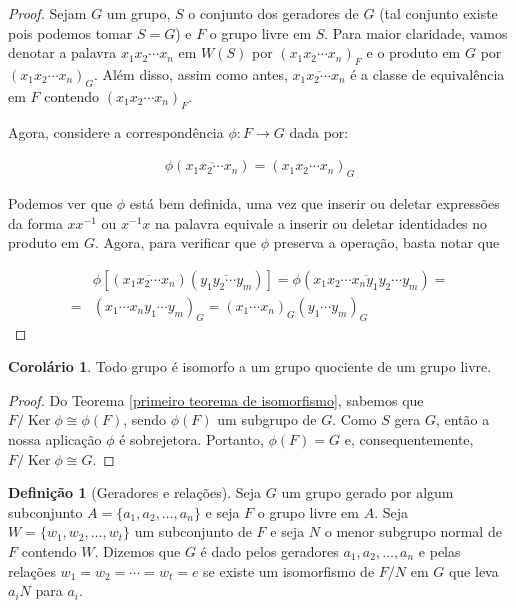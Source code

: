 \documentclass[a4paper,portuguese,11pt,twoside, leqno]{book}
\DeclareMathOperator{\Ker}{Ker}
\theoremstyle{definition}
\newtheorem{corollary}{Corolário}[theorem]
\newtheorem{deff}{Definição}[section]
\begin{document}
	\begin{proof}
		Sejam $G$ um grupo, $S$ o conjunto dos geradores de $G$ (tal conjunto existe pois podemos tomar $S = G$) e $F$ o grupo livre em $S$. Para maior claridade, vamos denotar a palavra $x_1x_2\cdots x_n$ em $W(S)$ por $(x_1x_2\cdots x_n)_F$ e o produto em $G$ por $(x_1x_2\cdots x_n)_G$. Além disso, assim como antes, $\overline{x_1x_2\cdots x_n}$ é a classe de equivalência em $F$ contendo $(x_1x_2\cdots x_n)_F$.
		
		\par\vspace{0.3cm} Agora, considere a correspondência $\phi: F\to G$ dada por: 
		
		\begin{align*}
		\phi(\overline{x_1x_2\cdots x_n}) = (x_1x_2\cdots x_n)_G
		\end{align*}
		
		\par\vspace{0.3cm} 
		Podemos ver que $\phi$ está bem definida, uma vez que inserir ou deletar expressões da forma $xx^{-1}$ ou $x^{-1}x$ na palavra equivale a inserir ou deletar identidades no produto em $G$. Agora, para verificar que $\phi$ preserva a operação, basta notar que
		
		\begin{align*}
		&\phi[(\overline{x_1x_2\cdots x_n})(\overline{y_1y_2\cdots y_m})] =  \phi(\overline{x_1x_2\cdots x_ny_1y_2\cdots y_m}) = \\ = &(x_1\cdots x_ny_1\cdots y_m)_G = (x_1\cdots x_n)_G(y_1\cdots y_m)_G
		\end{align*}
		
	\end{proof}
	
	\begin{corollary}
		\label{iso grupo quociente}
		Todo grupo é isomorfo a um grupo quociente de um grupo livre.
	\end{corollary}
	
	\begin{proof}
		Do Teorema \eqref{primeiro teorema de isomorfismo}, sabemos que $F/\Ker\phi\cong \phi(F)$, sendo $\phi(F)$ um subgrupo de $G$. Como $S$ gera $G$, então a nossa aplicação $\phi$ é sobrejetora. Portanto, $\phi(F) = G$ e, consequentemente, $F/\Ker\phi\cong G$.
	\end{proof}
	
	\begin{deff}[Geradores e relações]
		Seja $G$ um grupo gerado por algum subconjunto $A = \{ a_1, a_2, \dots, a_n \}$ e seja $F$ o grupo livre em $A$. Seja $W = \{ w_1, w_2, \dots, w_t \}$ um subconjunto de $F$ e seja $N$ o menor subgrupo normal de $F$ contendo $W$. Dizemos que $G$ é dado pelos geradores $a_1, a_2, \dots, a_n$ e pelas relações $w_1 = w_2 = \cdots = w_t = e$ se existe um isomorfismo de $F/N$ em $G$ que leva $a_iN$ para $a_i$.
	\end{deff}
	
\end{document}

